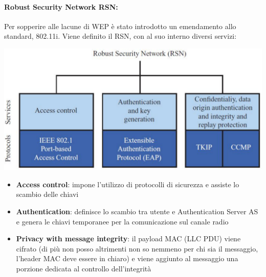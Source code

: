 \paragraph{Robust Security Network RSN:} Per sopperire alle lacune di WEP è stato introdotto un emendamento allo standard, 802.11i. Viene definito il RSN, con al suo interno diversi servizi:
\begin{center}
	\includegraphics[width=0.7\linewidth]{img/wlan/rns}
\end{center}
\begin{itemize}
	\item \textbf{Access control}: impone l'utilizzo di protocolli di sicurezza e assiste lo scambio delle chiavi

	\item \textbf{Authentication}: definisce lo scambio tra utente e Authentication Server AS e genera le chiavi temporanee per la comunicazione sul canale radio

	\item \textbf{Privacy with message integrity}: il payload MAC (LLC PDU) viene cifrato (di più non posso altrimenti non so nemmeno per chi sia il messaggio, l'header MAC deve essere in chiaro) e viene aggiunto al messaggio una porzione dedicata al controllo dell'integrità
\end{itemize}


